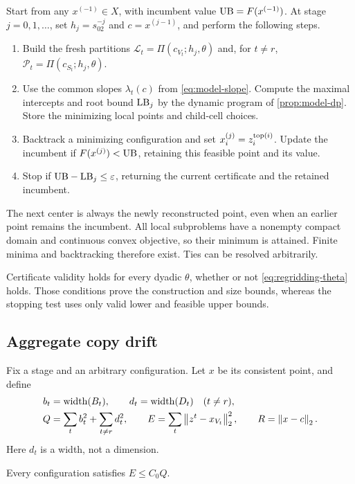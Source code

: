 Start from any $x^{(-1)}\in X$, with incumbent value
$\mathrm{UB}=F(x^{(-1)})$. At stage $j=0,1,\ldots$, set
$h_j=s_02^{-j}$ and $c=x^{(j-1)}$, and perform the following steps.
\begin{enumerate}
\item Build the fresh partitions
$\mathcal L_t=\Pi(c_{V_t};h_j,\theta)$ and, for $t\ne r$,
$\mathcal P_t=\Pi(c_{S_t};h_j,\theta)$.
\item Use the common slopes $\lambda_t(c)$ from
\eqref{eq:model-slope}. Compute the maximal intercepts and root bound
$\mathrm{LB}_j$ by the dynamic program of \cref{prop:model-dp}. Store the
minimizing local points and child-cell choices.
\item Backtrack a minimizing configuration and set
$x_i^{(j)}=z_i^{\operatorname{top}(i)}$. Update the incumbent if
$F(x^{(j)})<\mathrm{UB}$, retaining this feasible point and its value.
\item Stop if $\mathrm{UB}-\mathrm{LB}_j\le\varepsilon$, returning the current certificate
and the retained incumbent.
\end{enumerate}
The next center is always the newly reconstructed point, even when an
earlier point remains the incumbent. All local subproblems have a
nonempty compact domain and continuous convex objective, so their
minimum is attained. Finite minima and backtracking therefore exist.
Ties can be resolved arbitrarily.

Certificate validity holds for every dyadic $\theta$, whether or not
\eqref{eq:regridding-theta} holds. Those conditions prove the
construction and size bounds, whereas the stopping test uses only
valid lower and feasible upper bounds.

\subsection{Aggregate copy drift}

Fix a stage and an arbitrary configuration. Let $x$ be its consistent
point, and define
\begin{equation}\label{eq:regridding-aggregate}
\begin{split}
 b_t&=\operatorname{width}(B_t),\qquad d_t=\operatorname{width}(D_t)\quad(t\ne r),\\
 Q&=\sum_t b_t^2+\sum_{t\ne r}d_t^2,\qquad
 E=\sum_t\left\lVert z^t-x_{V_t}\right\rVert_2^2,\qquad R=\left\lVert x-c\right\rVert_2.
\end{split}
\end{equation}
Here $d_t$ is a width, not a dimension.

\begin{lemma}\label{lem:regridding-drift}
Every configuration satisfies $E\le C_0Q$.
\end{lemma}

